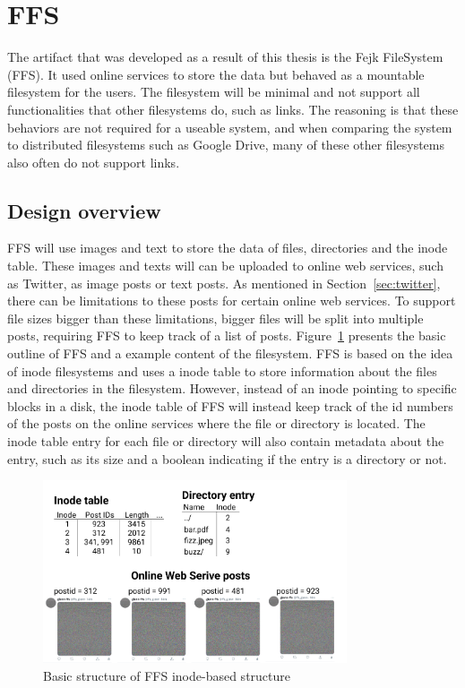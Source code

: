 \section{FFS}
The artifact that was developed as a result of this thesis is the Fejk FileSystem (FFS). It used online services to store the data but behaved as a mountable filesystem for the users. The filesystem will be minimal and not support all functionalities that other filesystems do, such as links. The reasoning is that these behaviors are not required for a useable system, and when comparing the system to distributed filesystems such as Google Drive, many of these other filesystems also often do not support links.

\subsection{Design overview}
FFS will use images and text to store the data of files, directories and the inode table. These images and texts will can be uploaded to online web services, such as Twitter, as image posts or text posts. As mentioned in Section~\ref{sec:twitter}, there can be limitations to these posts for certain online web services. To support file sizes bigger than these limitations, bigger files will be split into multiple posts, requiring FFS to keep track of a list of posts. Figure~\ref{fig:ffs_inode_diag} presents the basic outline of FFS and a example content of the filesystem. FFS is based on the idea of inode filesystems and uses a inode table to store information about the files and directories in the filesystem. However, instead of an inode pointing to specific blocks in a disk, the inode table of FFS will instead keep track of the id numbers of the posts on the online services where the file or directory is located. The inode table entry for each file or directory will also contain metadata about the entry, such as its size and a boolean indicating if the entry is a directory or not.

\begin{figure}[!ht]
	\begin{center}
	  \includegraphics[width=0.8\textwidth]{figures/ffs_inode_diagram.png}
	\end{center}
	\caption{Basic structure of FFS inode-based structure}
	\label{fig:ffs_inode_diag}
\end{figure}

